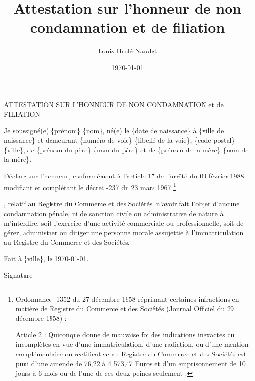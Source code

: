 \documentclass[french, 12pt]{report}
\title{Attestation sur l'honneur de non condamnation et de filiation}
\author{Louis Brulé Naudet}
\date{\today}
\newcommand\blfootnote[1]{%
  \begingroup
  \renewcommand\thefootnote{}\footnote{#1}%
  \addtocounter{footnote}{-1}%
  \endgroup
}
\begin{document}
\begin{center}
\LARGE{ATTESTATION SUR L'HONNEUR DE NON CONDAMNATION et de FILIATION}
\end{center}
\vspace{1cm}

Je soussigné(e) \{{prénom}\} \{{nom}\}, né(e) le \{{date de naissance}\} à \{{ville de naissance}\} et demeurant \{{numéro de voie}\} \{{libellé de la voie}\}, \{{code postal}\} \{{ville}\}, de \{{prénom du père}\} \{{nom du père}\} et de \{{prénom de la mère}\} \{{nom de la mère}\}.\par

Déclare sur l'honneur, conformément à l'article 17 de l'arrêté du 09 février 1988 modifiant et complétant le décret -237 du 23 mars 1967\blfootnote{Ordonnance -1352 du 27 décembre 1958 réprimant certaines infractions en matière de Registre du Commerce et des Sociétés (Journal Officiel du 29 décembre 1958) :  \vspace{1em}

Article 2 : \og Quiconque donne de mauvaise foi des indications inexactes ou incomplètes en vue d’une immatriculation, d'une radiation, ou d'une mention complémentaire ou rectificative au Registre du Commerce et des Sociétés est puni d'une amende de 76,22 à 4 573,47 Euros et d'un emprisonnement de 10 jours à 6 mois ou de l'une de ces deux peines seulement \fg{}.
}, relatif au Registre du Commerce et des Sociétés, n'avoir fait l'objet d'aucune condamnation pénale, ni de sanction civile ou administrative de nature à m'interdire, soit l'exercice d'une activité commerciale ou professionnelle, soit de gérer, administrer ou diriger une personne morale assujettie à l'immatriculation au Registre du Commerce et des Sociétés.\par

Fait à \{{ville}\}, le {\today}.\par
\hspace*{8cm}Signature
\end{document}
